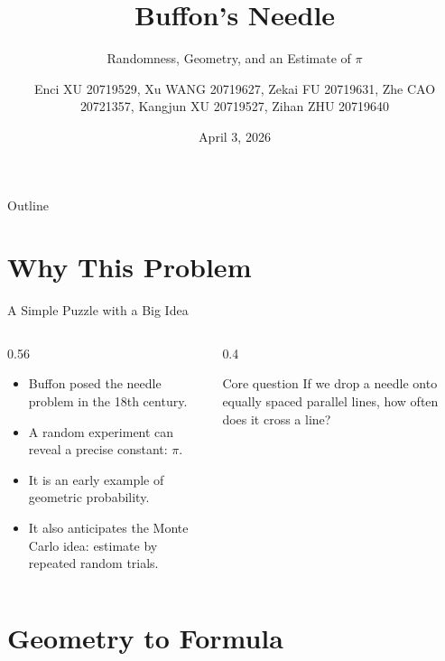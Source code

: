 \documentclass[aspectratio=169]{beamer}
\title{Buffon's Needle}
\subtitle{Randomness, Geometry, and an Estimate of $\pi$}
\author[Group 18]{Enci XU 20719529, Xu WANG 20719627, Zekai FU 20719631, Zhe CAO 20721357, Kangjun XU 20719527, Zihan ZHU 20719640}
\date{April 3, 2026}
\begin{document}
\begin{frame}
  \titlepage
\end{frame}

\begin{frame}{Outline}
  \tableofcontents
\end{frame}

\section{Why This Problem}

\begin{frame}{A Simple Puzzle with a Big Idea}
  \begin{columns}[T]
    \begin{column}{0.56\textwidth}
      \begin{itemize}
        \item Buffon posed the needle problem in the 18th century.
        \item A random experiment can reveal a precise constant: $\pi$.
        \item It is an early example of geometric probability.
        \item It also anticipates the Monte Carlo idea: estimate by repeated random trials.
      \end{itemize}
    \end{column}
    \begin{column}{0.4\textwidth}
      \begin{block}{Core question}
        If we drop a needle onto equally spaced parallel lines, how often does it cross a line?
      \end{block}
    \end{column}
  \end{columns}
\end{frame}

\section{Geometry to Formula}
\end{document}
